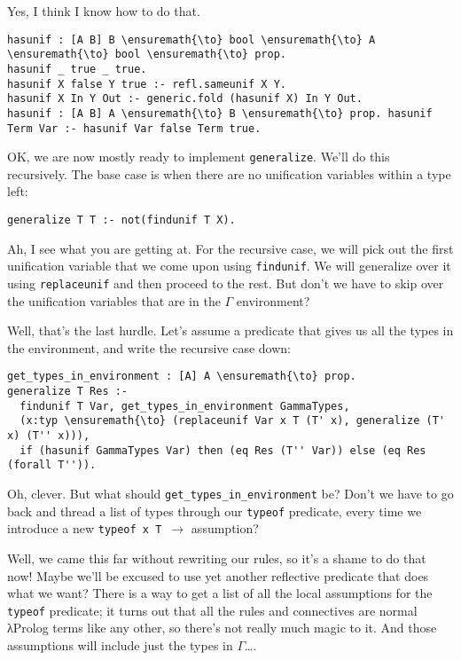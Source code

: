 \heroSTUDENT{} Yes, I think I know how to do that.

\begin{verbatim}
hasunif : [A B] B \ensuremath{\to} bool \ensuremath{\to} A \ensuremath{\to} bool \ensuremath{\to} prop.
hasunif _ true _ true.
hasunif X false Y true :- refl.sameunif X Y.
hasunif X In Y Out :- generic.fold (hasunif X) In Y Out.
hasunif : [A B] A \ensuremath{\to} B \ensuremath{\to} prop. hasunif Term Var :- hasunif Var false Term true.
\end{verbatim}

\heroADVISOR{} OK, we are now mostly ready to implement \texttt{generalize}.
We'll do this recursively. The base case is when there are no
unification variables within a type left:

\begin{verbatim}
generalize T T :- not(findunif T X).
\end{verbatim}

\heroSTUDENT{} Ah, I see what you are getting at. For the recursive case, we
will pick out the first unification variable that we come upon using
\texttt{findunif}. We will generalize over it using \texttt{replaceunif}
and then proceed to the rest. But don't we have to skip over the
unification variables that are in the \(\Gamma\) environment?

\heroADVISOR{} Well, that's the last hurdle. Let's assume a predicate that
gives us all the types in the environment, and write the recursive case
down:

\begin{verbatim}
get_types_in_environment : [A] A \ensuremath{\to} prop.
generalize T Res :- 
  findunif T Var, get_types_in_environment GammaTypes,
  (x:typ \ensuremath{\to} (replaceunif Var x T (T' x), generalize (T' x) (T'' x))),
  if (hasunif GammaTypes Var) then (eq Res (T'' Var)) else (eq Res (forall T'')).
\end{verbatim}

\heroSTUDENT{} Oh, clever. But what should
\texttt{get\_types\_in\_environment} be? Don't we have to go back and
thread a list of types through our \texttt{typeof} predicate, every time
we introduce a new \texttt{typeof\ x\ T\ \ensuremath{\to}} assumption?

\heroADVISOR{} Well, we came this far without rewriting our rules, so it's a
shame to do that now! Maybe we'll be excused to use yet another
reflective predicate that does what we want? There is a way to get a
list of all the local assumptions for the \texttt{typeof} predicate; it
turns out that all the rules and connectives are normal \foreignlanguage{greek}{λ}Prolog terms
like any other, so there's not really much magic to it. And those
assumptions will include just the types in \(\Gamma\)\ldots{}.

